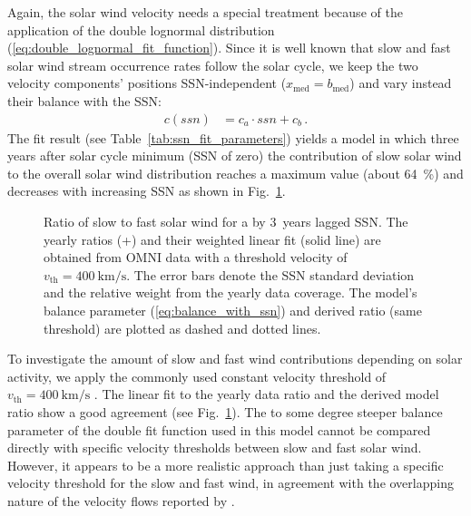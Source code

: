 \documentclass[]{aa}
\begin{document}
	Again, the solar wind velocity needs a special treatment because of the application of the double lognormal distribution (\ref{eq:double_lognormal_fit_function}). Since it is well known that slow and fast solar wind stream occurrence rates follow the solar cycle, we keep the two velocity components' positions SSN-independent ($x_\text{med} =  b_\text{med}$) and vary instead their balance with the SSN:
	\begin{align}
		c(ssn) &= c_a \cdot ssn + c_b\,.	\label{eq:balance_with_ssn}
	\end{align}
	The fit result (see Table~\ref{tab:ssn_fit_parameters}) yields a model in which three years after solar cycle minimum (SSN of zero) the contribution of slow solar wind to the overall solar wind distribution reaches a maximum value (about \SI{64}{\percent}) and decreases with increasing SSN as shown in Fig.~\ref{fig:Vdbl_SSN_ratio_f_plot}.
	\begin{figure}
		\caption{Ratio of slow to fast solar wind for a by 3~years lagged SSN. The yearly ratios (+) and their weighted linear fit (solid line) are obtained from OMNI data with a threshold velocity of $v_\text{th} = \SI{400}{\km\per\s}$. The error bars denote the SSN standard deviation and the relative weight from the yearly data coverage. The model's balance parameter (\ref{eq:balance_with_ssn}) and derived ratio (same threshold) are plotted as dashed and dotted lines.}
		\label{fig:Vdbl_SSN_ratio_f_plot}
	\end{figure}

	To investigate the amount of slow and fast wind contributions depending on solar activity, we apply the commonly used constant velocity threshold of $v_\text{th} = \SI{400}{\km\per\s}$ \citep[p.~144]{Schwenn1990}. The linear fit to the yearly data ratio and the derived model ratio show a good agreement (see Fig.~\ref{fig:Vdbl_SSN_ratio_f_plot}). The to some degree steeper balance parameter of the double fit function used in this model cannot be compared directly with specific velocity thresholds between slow and fast solar wind. However, it appears to be a more realistic approach than just taking a specific velocity threshold for the slow and fast wind, in agreement with the overlapping nature of the velocity flows reported by \citet{McGregor2011b}.
\end{document}
